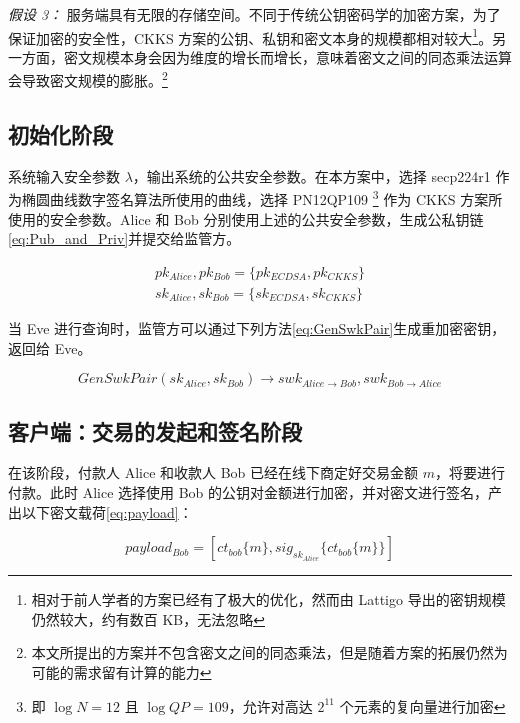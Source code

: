 \textit{假设 3：} 服务端具有无限的存储空间。不同于传统公钥密码学的加密方案，为了保证加密的安全性，CKKS 方案的公钥、私钥和密文本身的规模都相对较大\footnote{相对于前人学者的方案已经有了极大的优化，然而由 Lattigo 导出的密钥规模仍然较大，约有数百 KB，无法忽略}。另一方面，密文规模本身会因为维度的增长而增长，意味着密文之间的同态乘法运算会导致密文规模的膨胀。\footnote{本文所提出的方案并不包含密文之间的同态乘法，但是随着方案的拓展仍然为可能的需求留有计算的能力}

\subsection{初始化阶段}

系统输入安全参数 $\lambda$，输出系统的公共安全参数。在本方案中，选择 secp224r1 作为椭圆曲线数字签名算法所使用的曲线，选择 PN12QP109 \footnote{即 $\log N = 12$ 且 $\log QP = 109$，允许对高达 $2^{11}$ 个元素的复向量进行加密} 作为 CKKS 方案所使用的安全参数。Alice 和 Bob 分别使用上述的公共安全参数，生成公私钥链\eqref{eq:Pub_and_Priv}并提交给监管方。

\begin{equation} \label{eq:Pub_and_Priv}
\begin{aligned}
    pk_{Alice}, pk_{Bob} = \{pk_{ECDSA}, pk_{CKKS}\}\\
    sk_{Alice}, sk_{Bob} = \{sk_{ECDSA}, sk_{CKKS}\}
\end{aligned}
\end{equation}

当 Eve 进行查询时，监管方可以通过下列方法\eqref{eq:GenSwkPair}生成重加密密钥，返回给 Eve。

\begin{equation} \label{eq:GenSwkPair}
    GenSwkPair(sk_{Alice}, sk_{Bob}) \rightarrow swk_{Alice \rightarrow Bob},
    swk_{Bob \rightarrow Alice}
\end{equation}

\subsection{客户端：交易的发起和签名阶段}

在该阶段，付款人 Alice 和收款人 Bob 已经在线下商定好交易金额 $m$，将要进行付款。此时 Alice 选择使用 Bob 的公钥对金额进行加密，并对密文进行签名，产出以下密文载荷\eqref{eq:payload}：

\begin{equation} \label{eq:payload}
payload_{Bob} = [ct_{bob}\{m\}, sig_{sk_{Alice}}\{ct_{bob}\{m\}\}]    
\end{equation}

